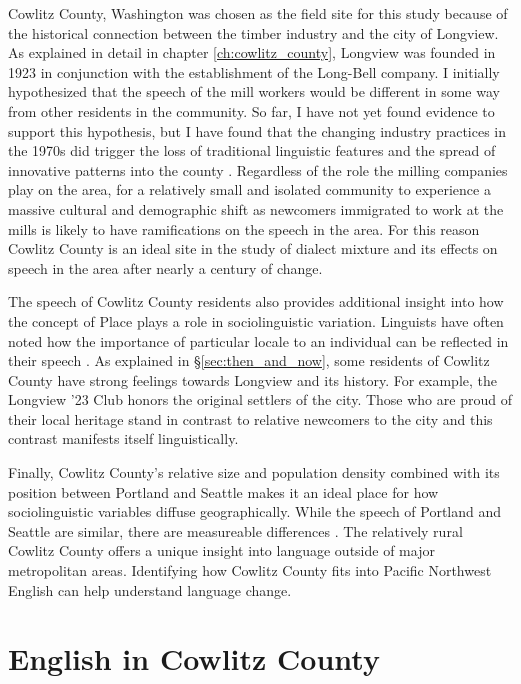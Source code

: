 Cowlitz County, Washington was chosen as the field site for this study because of the historical connection between the timber industry and the city of Longview. As explained in detail in chapter \ref{ch:cowlitz_county}, Longview was founded in 1923 in conjunction with the establishment of the Long-Bell company. I initially hypothesized that the speech of the mill workers would be different in some way from other residents in the community. So far, I have not yet found evidence to support this hypothesis, but I have found that the changing industry practices in the 1970s did trigger the loss of traditional linguistic features and the spread of innovative patterns into the county \citep{stanley_2018_pwpl}. Regardless of the role the milling companies play on the area, for a relatively small and isolated community to experience a massive cultural and demographic shift as newcomers immigrated to work at the mills is likely to have ramifications on the speech in the area. For this reason Cowlitz County is an ideal site in the study of dialect mixture and its effects on speech in the area after nearly a century of change.

The speech of Cowlitz County residents also provides additional insight into how the concept of Place plays a role in sociolinguistic variation. Linguists have often noted how the importance of particular locale to an individual can be reflected in their speech \citep{labov_1963, johnstone_etal_2002, carmichael_2014_diss, reed_2018}. As explained in \S\ref{sec:then_and_now}, some residents of Cowlitz County have strong feelings towards Longview and its history. For example, the Longview '23 Club honors the original settlers of the city. Those who are proud of their local heritage stand in contrast to relative newcomers to the city and this contrast manifests itself linguistically.

Finally, Cowlitz County's relative size and population density combined with its position between Portland and Seattle makes it an ideal place for how sociolinguistic variables diffuse geographically. While the speech of Portland and Seattle are similar, there are measureable differences \citep{becker_etal_2016_pads, wassink_2016_pads}. The relatively rural Cowlitz County offers a unique insight into language outside of major metropolitan areas. Identifying how Cowlitz County fits into Pacific Northwest English can help understand language change.



\section{English in Cowlitz County}

